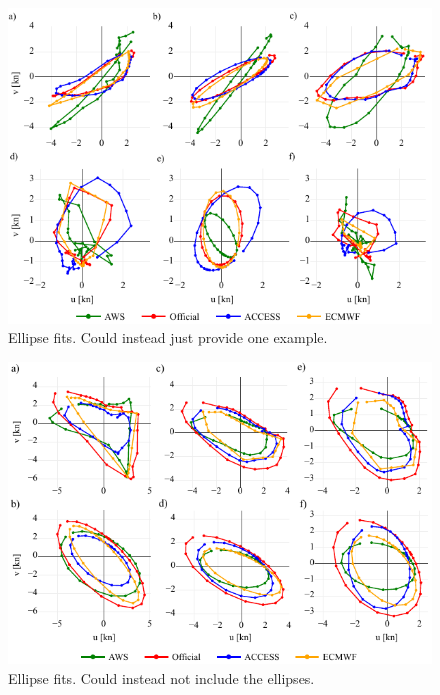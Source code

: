 \documentclass[alpha-refs]{wiley-article}
\begin{document}
\begin{figure}
\centering
\includegraphics{ellipse_hodo.pdf}
\caption{Ellipse fits. Could instead just provide one example.}
\label{Fig:ellipse_hodo}
\end{figure}

\begin{figure}
\centering
\includegraphics{nt_ellipse_hodo.pdf}
\caption{Ellipse fits. Could instead not include the ellipses.}
\label{Fig:ellipse_hodo}
\end{figure}

\end{document}
